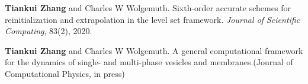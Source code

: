 
\begin{cventries}
  \cventry
    {} %
    {} %
    {} %
    {} %
    {
      \begin{cvitems} %
        \item {\textbf{Tiankui Zhang} and Charles W Wolgemuth. Sixth-order accurate schemes for reinitialization
and extrapolation in the level set framework. \textit{Journal of Scientific Computing}, 83(2), 2020.}
      \end{cvitems}
    }

  \cventry
    {} %
    {} %
    {} %
    {} %
    {
      \begin{cvitems} %
      	\item {\textbf{Tiankui Zhang} and Charles W Wolgemuth. A general computational framework for the dynamics of single- and multi-phase vesicles and membranes.(Journal of Computational Physics, in press)}
      \end{cvitems}
    }
\end{cventries}